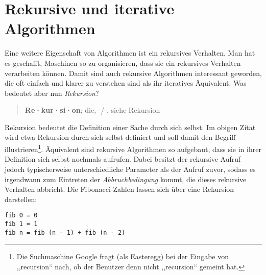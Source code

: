 \section{Rekursive und iterative Algorithmen}
%
Eine weitere Eigenschaft von Algorithmen ist ein rekursives Verhalten. Man hat es geschafft, Maschinen so zu organisieren, dass sie ein rekursives Verhalten verarbeiten können. Damit sind auch rekursive Algorithmen interessant geworden, die oft einfach und klarer zu verstehen sind als ihr iteratives Äquivalent. Was bedeutet aber nun \emph{Rekursion}?

\begin{quote}
   \textbf{Re·kur·si·on}; die, -/-, siehe Rekursion
\end{quote}

Rekursion bedeutet die Definition einer Sache durch sich selbst. Im obigen Zitat wird etwa Rekursion durch sich selbst definiert und soll damit den Begriff illustrieren\footnote{Die Suchmaschine Google fragt (als Easteregg) bei der Eingabe von ,,recursion`` nach, ob der Benutzer denn nicht ,,recursion`` gemeint hat.}. Äquivalent sind rekursive Algorithmen so aufgebaut, dass sie in ihrer Definition sich selbst nochmals aufrufen. Dabei besitzt der rekursive Aufruf jedoch typischerweise unterschiedliche Parameter als der Aufruf zuvor, sodass es irgendwann zum Eintreten der \emph{Abbruchbedingung} kommt, die dieses rekursive Verhalten abbricht. Die Fibonacci-Zahlen lassen sich über eine Rekursion darstellen:

\begin{lstlisting}
fib 0 = 0
fib 1 = 1
fib n = fib (n - 1) + fib (n - 2)
\end{lstlisting}

